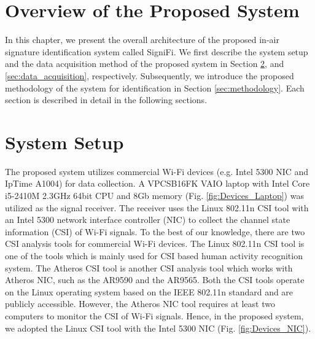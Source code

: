 \label{chp:Method}
\section{Overview of the Proposed System}
In this chapter, we present the overall architecture of the proposed in-air signature identification system called SigniFi. We first describe the system setup and the data acquisition method of the proposed system in Section \ref{sec:System}, and \ref{sec:data_acquisition}, respectively. Subsequently, we introduce the proposed methodology of the system for identification in Section \ref{sec:methodology}. Each section is described in detail in the following sections.

\section{System Setup}
\label{sec:System}
The proposed system utilizes commercial Wi-Fi devices (e.g. Intel 5300 NIC and IpTime A1004) for data collection. A VPCSB16FK VAIO laptop with Intel Core i5-2410M 2.3GHz 64bit CPU and 8Gb memory (Fig. \ref{fig:Devices_Laptop}) was utilized as the signal receiver. The receiver uses the Linux 802.11n CSI tool \cite{Halperin2011} with an Intel 5300 network interface controller (NIC) to collect the channel state information (CSI) of Wi-Fi signals. To the best of our knowledge, there are two CSI analysis tools for commercial Wi-Fi devices. The Linux 802.11n CSI tool is one of the tools which is mainly used for CSI based human activity recognition system. The Atheros CSI tool \cite{Xie2015} is another CSI analysis tool which works with Atheros NIC, such as the AR9590 and the AR9565. Both the CSI tools operate on the Linux operating system based on the IEEE 802.11n standard \cite{IEEE802} and are publicly accessible. However, the Atheros NIC tool requires at least two computers to monitor the CSI of Wi-Fi signals. Hence, in the proposed system, we adopted the Linux CSI tool with the Intel 5300 NIC (Fig. \ref{fig:Devices_NIC}).

%	
%	


